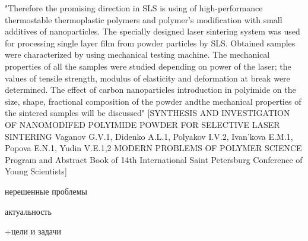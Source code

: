 	"Therefore the promising direction in SLS is using of high-performance thermostable
thermoplastic polymers and polymer’s modification with small additives of nanoparticles.
The specially designed laser sintering system was used for processing single layer film from powder particles by SLS. Obtained
samples were characterized by using mechanical testing machine.
The mechanical properties of all the samples were studied depending on power of the laser; the values of tensile strength, modulus of
elasticity and deformation at break were determined. The effect of carbon nanoparticles introduction in polyimide on the size, shape,
fractional composition of the powder andthe mechanical properties of the sintered samples will be discussed"
[SYNTHESIS AND INVESTIGATION OF NANOMODIFED POLYIMIDE POWDER FOR
SELECTIVE LASER SINTERING
Vaganov G.V.1, Didenko A.L.1, Polyakov I.V.2, Ivan’kova E.M.1, Popova E.N.1, Yudin V.E.1,2 MODERN PROBLEMS
OF POLYMER SCIENCE
Program and Abstract Book
of 14th International Saint Petersburg Conference
of Young Scientists]	

нерешенные проблемы

актуальность

+цели и задачи
